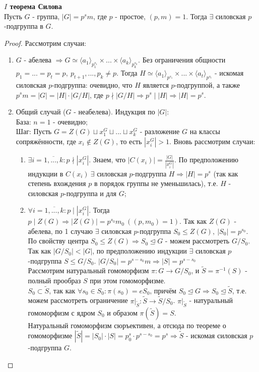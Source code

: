 \textbf{$I$ теорема Силова}\\
    Пусть $G$ - группа, $|G| = p^sm$, где $p$ - простое, $(p, m) = 1$. Тогда $\exists$ силовская $p$-подгруппа в $G$.
\begin{proof}
    Рассмотрим случаи:
    \begin{enumerate}
        \item $G$ - абелева $\Longrightarrow G \simeq \langle a_1 \rangle_{p_1^{s_1}} \times ... \times \langle a_k \rangle_{p_k^{s_k}}$. Без ограничения общности $p_1 = ... = p_t = p,\ p_{t+1},...,p_k \neq p$. Тогда $H \simeq \langle a_1 \rangle_{p^{s_1}} \times ... \times \langle a_t \rangle_{p^{s_t}}$ - искомая силовская $p$-подгруппа: очевидно, что $H$ является $p$-подгруппой, а также $p^sm = |G| = |H|\cdot|G/H|$, где $p \nmid |G/H| \Longrightarrow p^s \mid |H| \Longrightarrow |H| = p^s$.
        \item Общий случай ($G$ - неабелева). Индукция по $|G|$:\\
        База: $n = 1$ - очевидно;\\
        Шаг: Пусть $G = Z(G) \sqcup x_1^G \sqcup ... \sqcup x_k^G$ - разложение $G$ на классы сопряжённости, где $x_i \notin Z(G)$, то есть $|x_i^G| > 1$. Вновь рассмотрим случаи:
        \begin{enumerate}
            \item $\exists i = \overline{1,...,k}: p \nmid |x_i^G|$. Знаем, что $|C(x_i)| = \frac{|G|}{|x_i^G|}$. По предположению индукции в $C(x_i) \ \exists$ силовская $p$-подгруппа $H \Longrightarrow |H| = p^s$ (так как степень вхождения $p$ в порядок группы не уменьшилась), т.е. $H$ - силовская $p$-подгруппа и для $G$;
            \item $\forall i = \overline{1,...,k}: p \mid |x_i^G|$. Тогда $p \mid Z(G) \Longrightarrow |Z(G)| = p^{s_0}m_0 \ ((p, m_0) = 1)$. Так как $Z(G)$ - абелева, по 1 случаю $\exists$ силовская $p$-подгруппа $S_0 \leq Z(G), \ |S_0| = p^{s_0}$.\\
            По свойству центра $S_0 \leq Z(G) \Longrightarrow S_0 \unlhd G$ - можем рассмотреть $G/S_0$.
            Так как $|G/S_0| < |G|$, по предположению индукции $\exists$ силовская $p$-подгруппа $S \leq G/S_0$. $|G/S_0| = p^{s-s_0}m \Longrightarrow |S| = p^{s-s_0}$\\
            Рассмотрим натуральный гомоморфизм $\pi: G \rightarrow G/S_0$, и $\tilde{S} = \pi^{-1}(S)$ - полный прообраз $S$ при этом гомоморфизме.\\
            $S_0 \subset \tilde{S}$, так как $\forall s_0 \in S_0: \pi(s_0) = eS_0$, причём $S_0 \unlhd G \Longrightarrow S_0 \unlhd \tilde{S}$, т.е. можем рассмотреть ограничение $\pi|_{\tilde{S}}: \tilde{S} \rightarrow \tilde{S}/S_0$. $\pi|_{\tilde{S}}$ - натуральный гомоморфизм с ядром $S_0$ и образом $\pi(\tilde{S}) = S$.\\
            Натуральный гомоморфизм сюръективен, а отсюда по теореме о гомоморфизме $|\tilde{S}| = |S_0|\cdot|S| = p^s_0 \cdot p^{s-s_0} = p^s \Longrightarrow \tilde{S}$ - искомая силовская $p$-подгруппа $G$. 
        \end{enumerate}
    \end{enumerate}
\end{proof}
